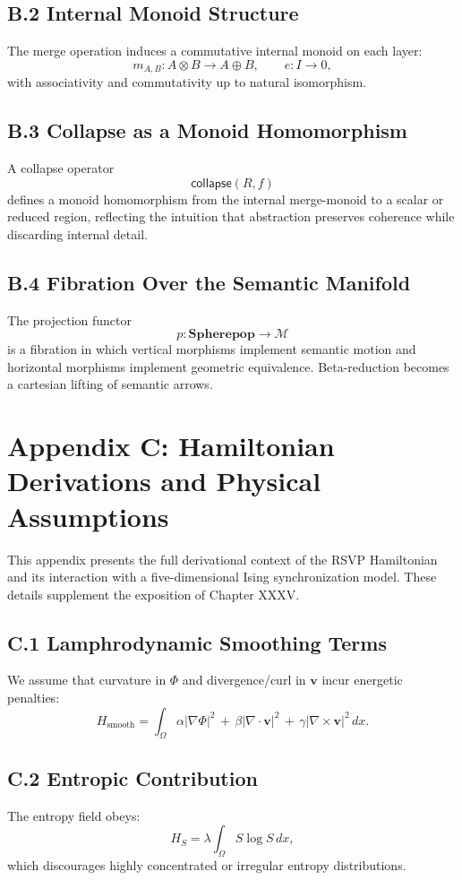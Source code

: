 \documentclass[11pt,letterpaper]{article}
\begin{document}
\subsection*{B.2 Internal Monoid Structure}
The merge operation induces a commutative internal monoid on each layer:
\[
m_{A,B} : A \otimes B \to A \oplus B,
\qquad
e : I \to 0,
\]
with associativity and commutativity up to natural isomorphism.

\subsection*{B.3 Collapse as a Monoid Homomorphism}
A collapse operator
\[
\mathsf{collapse}(R,f)
\]
defines a monoid homomorphism from the internal merge-monoid to a scalar or
reduced region, reflecting the intuition that abstraction preserves coherence
while discarding internal detail.

\subsection*{B.4 Fibration Over the Semantic Manifold}
The projection functor
\[
p : \mathbf{Spherepop} \to \mathcal{M}
\]
is a fibration in which vertical morphisms implement semantic motion and
horizontal morphisms implement geometric equivalence.  Beta-reduction becomes a
cartesian lifting of semantic arrows.


\section{Appendix C: Hamiltonian Derivations and Physical Assumptions}

This appendix presents the full derivational context of the RSVP Hamiltonian and
its interaction with a five-dimensional Ising synchronization model.  These
details supplement the exposition of Chapter XXXV.

\subsection*{C.1 Lamphrodynamic Smoothing Terms}
We assume that curvature in $\Phi$ and divergence/curl in $\mathbf{v}$ incur
energetic penalties:
\[
H_{\text{smooth}}
=
\int_{\Omega}
\alpha |\nabla\Phi|^2
\,+\,
\beta|\nabla\cdot\mathbf{v}|^2
\,+\,
\gamma|\nabla\times\mathbf{v}|^2
\,dx.
\]

\subsection*{C.2 Entropic Contribution}
The entropy field obeys:
\[
H_S
=
\lambda\int_{\Omega} S\log S \, dx,
\]
which discourages highly concentrated or irregular entropy distributions.
\end{document}
